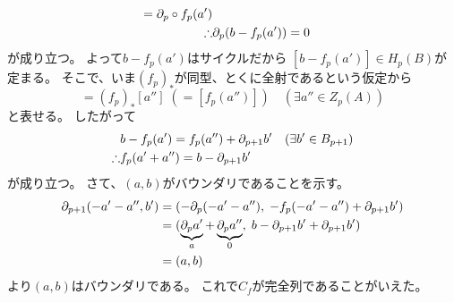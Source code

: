 \documentclass[report]{jlreq}
\begin{document}
\begin{answer}
\begin{align}
            = \partial_{p} \circ f_{p}(a') \\
        \therefore
            &\partial_p (b - f_{p}(a'))
            = 0
    \end{align}
    が成り立つ。
    よって$b - f_{p}(a')$はサイクルだから
    $[b - f_{p}(a')] \in H_p(B)$が定まる。
    そこで、いま$(f_{p})_*$が同型、とくに全射であるという仮定から
    \begin{equation}
        [b - f_{p}(a')] = (f_{p})_* [a''] \; (= [f_{p}(a'')])
        \quad (\exists a'' \in Z_p(A))
    \end{equation}
    と表せる。
    したがって
    \begin{align}
        &b - f_{p}(a') = f_{p}(a'') + \partial_{p + 1} b'
            \quad (\exists b' \in B_{p + 1}) \\
        \therefore &f_{p}(a' + a'') = b - \partial_{p + 1} b'
    \end{align}
    が成り立つ。
    さて、$(a, b)$がバウンダリであることを示す。
    \begin{alignat}{1}
        \partial_{p + 1}(- a' - a'', b')
            &= (
                - \partial_{p}(- a' - a''), \;
                - f_{p}(- a' - a'') + \partial_{p + 1} b'
            ) \\
            &= (
                \underbrace{\partial_{p} a'}_{a}
                    + \underbrace{\partial_{p} a''}_{0}, \;
                b - \partial_{p + 1} b' + \partial_{p + 1} b'
            ) \\
            &= (a, b)
    \end{alignat}
    より$(a, b)$はバウンダリである。
    これで$C_f$が完全列であることがいえた。


\end{answer}
\end{document}
